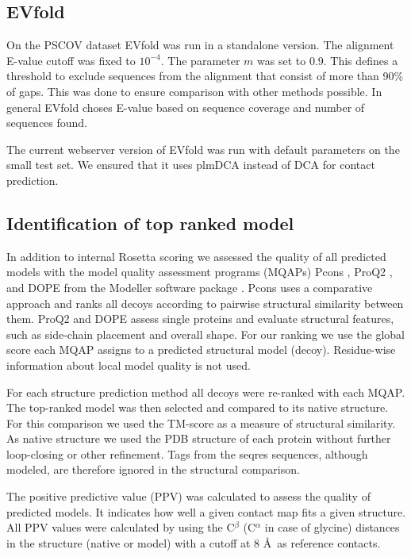 \documentclass{bioinfo}
\begin{document}
\begin{methods}
\subsection{EVfold}
On the PSCOV dataset EVfold was run in a standalone version. The alignment E-value cutoff was fixed to $10^{-4}$. The parameter $m$ was set to 0.9. This defines a threshold to exclude sequences from the alignment that consist of more than 90\% of gaps. This was done to ensure comparison with other methods possible. In general EVfold choses E-value based on sequence coverage and number of sequences found.

The current webserver version of EVfold was run with default parameters on the small test set. We ensured that it uses plmDCA instead of DCA for contact prediction.

\subsection{Identification of top ranked model}

In addition to internal Rosetta scoring we assessed the quality of all
predicted models with the model quality assessment programs (MQAPs)
Pcons \cite[]{lundstrom_pcons:_2001}, ProQ2
\cite[]{ray_improved_2012}, and DOPE from the Modeller software
package \cite[]{eswar_comparative_2006}. Pcons uses a comparative
approach and ranks all decoys according to pairwise structural
similarity between them. ProQ2 and DOPE assess single proteins and
evaluate structural features, such as side-chain placement and overall
shape. For our ranking we use the global score each MQAP assigns to a
predicted structural model (decoy). Residue-wise information about
local model quality is not used. 

For each structure prediction method all decoys were re-ranked with
each MQAP. The top-ranked model was then selected and compared to its
native structure. For this comparison we used the TM-score
\cite[]{zhang_scoring_2004} as a measure of structural similarity. As
native structure we used the PDB structure of each protein without
further loop-closing or other refinement. Tags from the seqres
sequences, although modeled, are therefore ignored in the structural
comparison.

The positive predictive value (PPV) was calculated to assess the quality of predicted models. It indicates how well a given contact map fits a given structure. All PPV values were calculated by using the C$^{\beta}$ (C$^{\alpha}$ in case of glycine) distances in the structure (native or model) with a cutoff at 8 \AA\ as reference contacts.



\end{methods}
\end{document}
